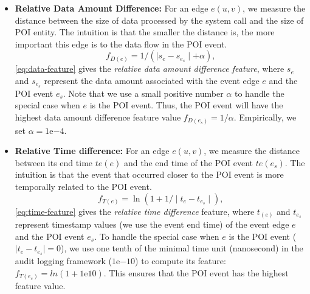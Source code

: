 \begin{itemize}[noitemsep, topsep=1pt, partopsep=1pt, listparindent=\parindent, leftmargin=*]

\item \textbf{Relative Data Amount Difference:}
For an edge $e(u, v)$, we measure the distance between the size of data processed by the system call and the size of POI entity.
The intuition is that the smaller the distance is, the more important this edge is to the data flow in the POI event.
\begin{equation}
\label{eq:data-feature}
    f_{D(e)} = 1/(\mid s_{e} - s_{e_s}\mid + \alpha),
\end{equation}
\cref{eq:data-feature} gives the \emph{relative data amount difference feature},
where $s_{e}$ and $s_{e_s}$ represent the data amount associated with the event edge $e$ and the POI event $e_s$.
Note that
we use a small positive number $\alpha$ to handle the special case when $e$ is the POI event. Thus, the POI event will have the highest data amount difference feature value $f_{D(e_s)} = 1/\alpha$. Empirically, we set $\alpha = 1\mathrm{e}{-4}$.


\item \textbf{Relative Time difference:}
For an edge $e(u,v)$, we measure the distance between its end time $te(e)$ and the end time of the POI event $te(e_s)$.
The intuition is that the event that occurred closer to the POI event is more temporally related to the POI event.
\begin{equation}
\label{eq:time-feature}
    f_{T(e)} = \ln(1 + 1/\mid t_{e} - t_{e_s}\mid),
\end{equation}
\cref{eq:time-feature} gives the \emph{relative time difference} feature, where $t_{(e)}$ and $t_{e_s}$ represent timestamp values (we use the event end time) 
of the event edge $e$ and the POI event $e_s$. 
To handle the special case when $e$ is the POI event (\ie $\mid t_{e} - t_{e_s}\mid = 0$), we use one tenth of the minimal time unit (nanosecond) in the audit logging framework (\ie $1\mathrm{e}{-10}$) to compute its feature: $f_{T(e_s)} = ln(1 + 1\mathrm{e}{10})$. This ensures that the POI event has the highest feature value.


\end{itemize}
